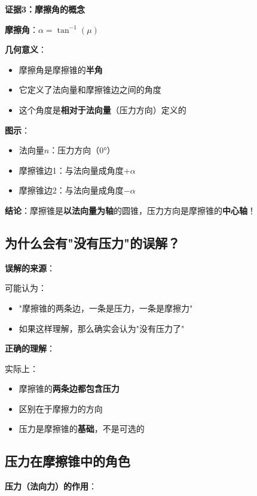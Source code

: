 \documentclass[12pt,a4paper]{article}
\begin{document}
\textbf{证据3：摩擦角的概念}

\textbf{摩擦角}：$\alpha = \tan^{-1}(\mu)$

\textbf{几何意义}：
\begin{itemize}
\item 摩擦角是摩擦锥的\textbf{半角}
\item 它定义了法向量和摩擦锥边之间的角度
\item 这个角度是\textbf{相对于法向量}（压力方向）定义的
\end{itemize}

\textbf{图示}：
\begin{itemize}
\item 法向量$\hat{n}$：压力方向（0°）
\item 摩擦锥边1：与法向量成角度$+\alpha$
\item 摩擦锥边2：与法向量成角度$-\alpha$
\end{itemize}

\textbf{结论}：摩擦锥是\textbf{以法向量为轴}的圆锥，压力方向是摩擦锥的\textbf{中心轴}！

\subsection{为什么会有"没有压力"的误解？}

\textbf{误解的来源}：

可能认为：
\begin{itemize}
\item "摩擦锥的两条边，一条是压力，一条是摩擦力"
\item 如果这样理解，那么确实会认为"没有压力了"
\end{itemize}

\textbf{正确的理解}：

实际上：
\begin{itemize}
\item 摩擦锥的\textbf{两条边都包含压力}
\item 区别在于摩擦力的方向
\item 压力是摩擦锥的\textbf{基础}，不是可选的
\end{itemize}

\subsection{压力在摩擦锥中的角色}

\textbf{压力（法向力）的作用}：
\end{document}
